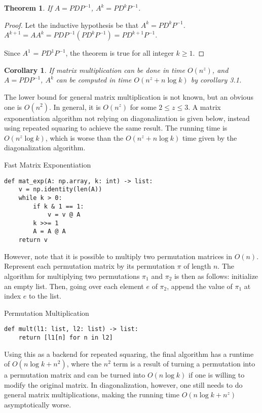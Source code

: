 \documentclass[11pt, oneside]{article}
\theoremstyle{plain}
\newtheorem{theorem}{Theorem}[section]
\newtheorem{corollary}{Corollary}[theorem]
\theoremstyle{definition}
\begin{document}
\begin{theorem}
If \( A = P D P^{-1} \), \( A^k = P D^k P^{-1} \).
\end{theorem}
\begin{proof}
Let the inductive hypothesis be that \( A^k = P D^k P^{-1} \). \\
\( A^{k + 1} = A A^{k} = P D P^{-1}(P D^k P^{-1}) = P D^{k + 1} P^{-1} \).

Since \( A^1 \) = \( P D^1 P^{-1} \), the theorem is true for all integer \( k \geq 1 \).
\end{proof}

\begin{corollary}
If matrix multiplication can be done in time \( O(n^z) \),
and \( A = PDP^{-1} \), \( A^k \) can be computed in time \( O(n^z + n \log k ) \)
by corollary 3.1.
\end{corollary}

The lower bound for general matrix multiplication is not known, but an obvious one is
\( O(n^2) \). In general, it is \( O(n^z) \) for some \( 2 \leq z \leq 3 \).
A matrix exponentiation algorithm not relying on diagonalization is given
below, instead using repeated squaring to achieve the same result.
The running time is \( O(n^z \log k) \), which is worse than the
\( O(n^z + n \log k ) \) time given by the diagonalization algorithm.

\begin{algorithm}
\caption{Fast Matrix Exponentiation}
\begin{verbatim}
def mat_exp(A: np.array, k: int) -> list:
    v = np.identity(len(A))
    while k > 0:
        if k & 1 == 1:
            v = v @ A
        k >>= 1
        A = A @ A
    return v
\end{verbatim}
\end{algorithm}

However, note that it is possible to multiply
two permutation matrices in \( O(n) \).
Represent each permutation matrix by its permutation \( \pi \)
of length \( n \). The algorithm for multiplying two permutations \( \pi_1 \)
and \( \pi_2 \) is then as follows: initialize an empty list.
Then, going over each element \( e \) of \( \pi_2 \),
append the value of \( \pi_1 \) at index \( e \) to the list.

\begin{algorithm}
\caption{Permutation Multiplication}
\begin{verbatim}
def mult(l1: list, l2: list) -> list:
    return [l1[n] for n in l2]
\end{verbatim}
\end{algorithm}

Using this as a backend for repeated squaring, the final algorithm has a runtime
of \( O(n \log k + n^2) \), where the \( n^2 \) term is a result of
turning a permutation into a permutation matrix and can be turned into
\( O(n \log k) \) if one is willing to modify the original matrix.
In diagonalization, however, one still needs to do general matrix multiplications,
making the running time \( O(n \log k + n^z) \) asymptotically worse.

\printbibliography
\end{document}
